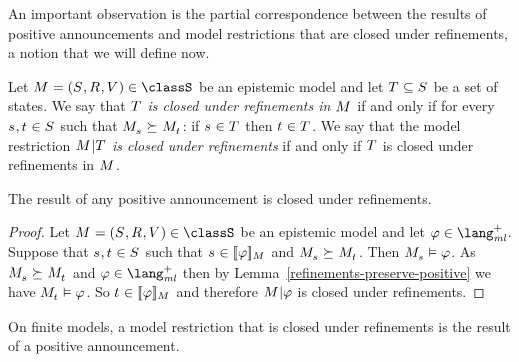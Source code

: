 An important observation is the partial correspondence between the results of positive announcements and model restrictions that are closed under refinements, a notion that we will define now.

\begin{definition}\label{closed-under-refinements}
Let $\kModelAndTuple \in \classS$ be an epistemic model and 
let $\kStatesT \subseteq \kStates$ be a set of states.
We say that {\em $\kStatesT$ is closed under refinements in $\kModel$} if and only if for every $\kStateS, \kStateT \in \kStates$ such that $\kPModel{\kStateS} \simulates \kPModel{\kStateT}$: if $\kStateS \in \kStatesT$ then $\kStateT \in \kStatesT$.
We say that the model restriction {\em $\restrict{\kModel}{\kStatesT}$ is closed under refinements} if and only if $\kStatesT$ is closed under refinements in $\kModel$.
\end{definition}

\begin{lemma}\label{positive-announcements-refinement-closed}
The result of any positive announcement is closed under refinements.
\end{lemma}

\begin{proof}
Let $\kModelAndTuple \in \classS$ be an epistemic model and
let $\phi \in \langMlPlus$.
Suppose that $\kStateS, \kStateT \in \kStates$ such that $\kStateS \in \interpretation[\kModel]{\phi}$ and $\kPModel{\kStateS} \simulates \kPModel{\kStateT}$.
Then $\kPModel{\kStateS} \entails \phi$.
As $\kPModel{\kStateS} \simulates \kPModel{\kStateT}$ and $\phi \in \langMlPlus$ then by Lemma~\ref{refinements-preserve-positive} we have $\kPModel{\kStateT} \entails \phi$.
So $\kStateT \in \interpretation[\kModel]{\phi}$ and therefore $\restrict{\kModel}{\phi}$ is closed under refinements.
\end{proof}

\begin{lemma}\label{refinement-closed-positive-announcements}
On finite models, a model restriction that is closed under refinements is the result of a positive announcement.
\end{lemma}

